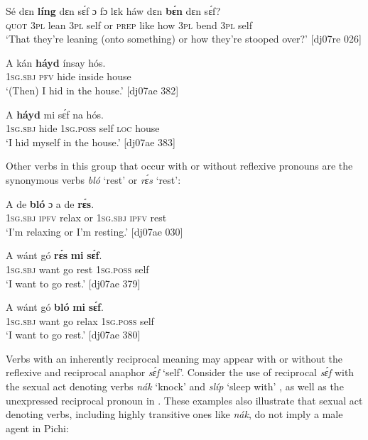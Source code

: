 \ea%
    \label{ex:key:1304}
    \gll Sé    dɛn  \textbf{líng}    dɛn  sɛ́f  ɔ  fɔ  lɛk  háw  
dɛn  \textbf{bɛ́n}    dɛn  sɛ́f?\\
\textsc{quot}    \textsc{3pl}  lean    \textsc{3pl}  self  or  \textsc{prep}  like  how  
\textsc{3pl}  bend  \textsc{3pl}  self\\

\glt ‘That they’re leaning (onto something) or how 
they’re stooped over?’ [dj07re 026]
\z


\ea%
    \label{ex:key:1305}
    \gll A    kán  \textbf{háyd}  ínsay  hós.\\
\textsc{1sg.sbj}  \textsc{pfv}  hide    inside  house\\

\glt ‘(Then) I hid in the house.’ [dj07ae 382]
\z


\ea%
    \label{ex:key:1306}
    \gll A    \textbf{háyd}  mi    sɛ́f  na  hós.\\
\textsc{1sg.sbj}  hide    \textsc{1sg.poss}  self  \textsc{loc}  house\\

\glt ‘I hid myself in the house.’ [dj07ae 383]
\z

Other verbs in this group that occur with or without reflexive pronouns are the synonymous verbs \textit{bló} ‘rest’ or \textit{rɛ́s} ‘rest’:


\ea%
    \label{ex:key:1307}
    \gll A    de  \textbf{bló}    ɔ  a    de  \textbf{rɛ́s}.\\
\textsc{1sg.sbj}  \textsc{ipfv}  relax  or  \textsc{1sg.sbj}  \textsc{ipfv}  rest\\

\glt ‘I’m relaxing or I’m resting.’ [dj07ae 030]
\z


\ea%
    \label{ex:key:1308}
    \gll A    wánt  gó  \textbf{rɛ́s}  \textbf{mi}    \textbf{sɛ́f}.\\
\textsc{1sg.sbj}  want  go  rest  \textsc{1sg.poss}  self\\

\glt ‘I want to go rest.’ [dj07ae 379]
\z


\ea%
    \label{ex:key:1309}
    \gll A    wánt  gó  \textbf{bló}    \textbf{mi}    \textbf{sɛ́f}.\\
\textsc{1sg.sbj}  want  go  relax  \textsc{1sg.poss}  self\\

\glt ‘I want to go rest.’ [dj07ae 380]
\z

Verbs with an inherently reciprocal meaning may appear with or without the reflexive and reciprocal anaphor \textit{sɛ́f} ‘self’. Consider the use of reciprocal \textit{sɛ́f} with the sexual act denoting verbs \textit{nák} ‘knock’  and \textit{slíp} ‘sleep with’ , as well as the unexpressed reciprocal pronoun in . These examples also illustrate that sexual act denoting verbs, including highly transitive ones like \textit{nák}, do not imply a male agent in Pichi:


